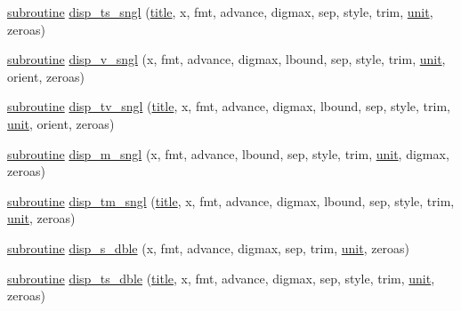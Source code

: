 \begin{DoxyCompactItemize}
\item 
\hyperlink{M__stopwatch_83_8txt_acfbcff50169d691ff02d4a123ed70482}{subroutine} \hyperlink{interfacem__display_1_1disp_a0e80d145843fccdff1b3d16978f548ea}{disp\+\_\+ts\+\_\+sngl} (\hyperlink{print__watch_83_8txt_a15b5bd21156bb9fca6a755ab8c029a9c}{title}, x, fmt, advance, digmax, sep, style, trim, \hyperlink{M__stopwatch_83_8txt_a5cbef30eb7c0d734bd82f5a7ebea9aa7}{unit}, zeroas)
\item 
\hyperlink{M__stopwatch_83_8txt_acfbcff50169d691ff02d4a123ed70482}{subroutine} \hyperlink{interfacem__display_1_1disp_ab53aa910e90a0f61e3517b55b9330b3a}{disp\+\_\+v\+\_\+sngl} (x, fmt, advance, digmax, lbound, sep, style, trim, \hyperlink{M__stopwatch_83_8txt_a5cbef30eb7c0d734bd82f5a7ebea9aa7}{unit}, orient, zeroas)
\item 
\hyperlink{M__stopwatch_83_8txt_acfbcff50169d691ff02d4a123ed70482}{subroutine} \hyperlink{interfacem__display_1_1disp_ae9ba998677d2316c926d6a20fed0d961}{disp\+\_\+tv\+\_\+sngl} (\hyperlink{print__watch_83_8txt_a15b5bd21156bb9fca6a755ab8c029a9c}{title}, x, fmt, advance, digmax, lbound, sep, style, trim, \hyperlink{M__stopwatch_83_8txt_a5cbef30eb7c0d734bd82f5a7ebea9aa7}{unit}, orient, zeroas)
\item 
\hyperlink{M__stopwatch_83_8txt_acfbcff50169d691ff02d4a123ed70482}{subroutine} \hyperlink{interfacem__display_1_1disp_a8a0ed197feefcf1e124a9d351c6fc49c}{disp\+\_\+m\+\_\+sngl} (x, fmt, advance, lbound, sep, style, trim, \hyperlink{M__stopwatch_83_8txt_a5cbef30eb7c0d734bd82f5a7ebea9aa7}{unit}, digmax, zeroas)
\item 
\hyperlink{M__stopwatch_83_8txt_acfbcff50169d691ff02d4a123ed70482}{subroutine} \hyperlink{interfacem__display_1_1disp_ade2834c379f265869fc0c125670bce80}{disp\+\_\+tm\+\_\+sngl} (\hyperlink{print__watch_83_8txt_a15b5bd21156bb9fca6a755ab8c029a9c}{title}, x, fmt, advance, digmax, lbound, sep, style, trim, \hyperlink{M__stopwatch_83_8txt_a5cbef30eb7c0d734bd82f5a7ebea9aa7}{unit}, zeroas)
\item 
\hyperlink{M__stopwatch_83_8txt_acfbcff50169d691ff02d4a123ed70482}{subroutine} \hyperlink{interfacem__display_1_1disp_ad4b6a8f535c3750a195554259119c514}{disp\+\_\+s\+\_\+dble} (x, fmt, advance, digmax, sep, trim, \hyperlink{M__stopwatch_83_8txt_a5cbef30eb7c0d734bd82f5a7ebea9aa7}{unit}, zeroas)
\item 
\hyperlink{M__stopwatch_83_8txt_acfbcff50169d691ff02d4a123ed70482}{subroutine} \hyperlink{interfacem__display_1_1disp_a6b728f696502ea6b92dfb53333e0ff82}{disp\+\_\+ts\+\_\+dble} (\hyperlink{print__watch_83_8txt_a15b5bd21156bb9fca6a755ab8c029a9c}{title}, x, fmt, advance, digmax, sep, style, trim, \hyperlink{M__stopwatch_83_8txt_a5cbef30eb7c0d734bd82f5a7ebea9aa7}{unit}, zeroas)

\end{DoxyCompactItemize}
